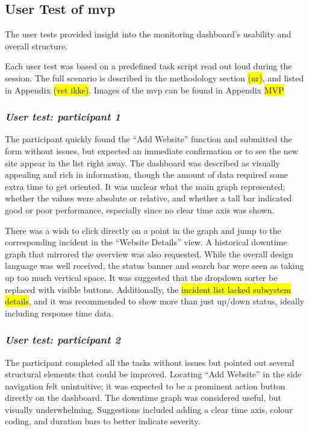 \subsection{User Test of \acrshort{mvp}}
The user tests provided insight into the monitoring dashboard's usability and overall structure.

Each user test was based on a predefined task script read out loud during the session. The full scenario is described in the methodology section \colorbox{yellow}{(nr)}, and listed in Appendix \colorbox{yellow}{(vet ikke)}. Images of the \acrshort{mvp} can be found in Appendix \colorbox{yellow}{MVP}

\subsubsection{\textit{\textbf{User test: participant 1}}}

The participant quickly found the “Add Website” function and submitted the form without issues, but expected an immediate confirmation or to see the new site appear in the list right away. The dashboard was described as visually appealing and rich in information, though the amount of data required some extra time to get oriented.  It was unclear what the main graph represented; whether the values were absolute or relative, and whether a tall bar indicated good or poor performance, especially since no clear time axis was shown. 

There was a wish to click directly on a point in the graph and jump to the corresponding incident in the “Website Details” view. A historical downtime graph that mirrored the overview was also requested. While the overall design language was well received, the status banner and search bar were seen as taking up too much vertical space. It was suggested that the dropdown sorter be replaced with visible buttons. Additionally, the \colorbox{yellow}{incident list lacked subsystem details}, and it was recommended to show more than just up/down status, ideally including response time data. 


\subsubsection{\textit{\textbf{User test: participant 2}}}

The participant completed all the tasks without issues but pointed out several structural elements that could be improved. Locating “Add Website” in the side navigation felt unintuitive; it was expected to be a prominent action button directly on the dashboard. The downtime graph was considered useful, but visually underwhelming. Suggestions included adding a clear time axis, colour coding, and duration bars to better indicate severity. 


